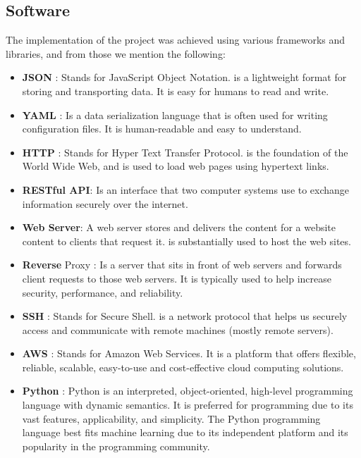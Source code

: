 \subsection{Software}
    The implementation of the project was achieved using various frameworks and libraries, and from those we mention the following: \\
    \footnotesize
    \begin{itemize}
        \item \textbf{JSON} : Stands for JavaScript Object Notation. is a lightweight format for storing and transporting data. It is easy for humans to read and write. ~\cite{4}
        \item \textbf{YAML} : Is a data serialization language that is often used for writing configuration files. It is human-readable and easy to understand. ~\cite{5}
        \item \textbf{HTTP} : Stands for Hyper Text Transfer Protocol. is the foundation of the World Wide Web, and is used to load web pages using hypertext links. ~\cite{6}
        \item \textbf{RESTful API}: Is an interface that two computer systems use to exchange information securely over the internet. ~\cite{7}
        \item \textbf{Web Server}: A web server stores and delivers the content for a website content to clients that request it. is substantially used to host the web sites. ~\cite{8}
        \item \textbf{Reverse} Proxy : Is a server that sits in front of web servers and forwards client requests to those web servers. It is typically  used to help increase security, performance, and reliability. ~\cite{9}
        \item \textbf{SSH} : Stands for Secure Shell. is a network protocol that helps us securely access and communicate with remote machines (mostly remote servers). ~\cite{11}
        \item \textbf{AWS} : Stands for Amazon Web Services. It is a platform that offers flexible, reliable, scalable, easy-to-use and cost-effective cloud computing solutions. ~\cite{12}
        \item \textbf{Python} : Python is an interpreted, object-oriented, high-level programming language with dynamic semantics. It is preferred for programming due to its vast features, applicability, and simplicity. The Python programming language best fits machine learning due to its independent platform and its popularity in the programming community. ~\cite{15}

\end{itemize}
